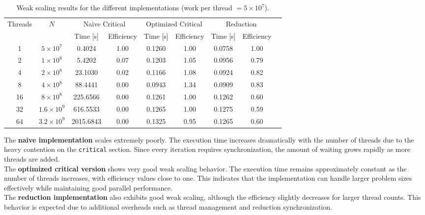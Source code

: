 \documentclass[unicode,10pt,a4paper,oneside,numbers=endperiod,openany]{scrartcl}
\begin{document}
\begin{table}[!h]
\centering
\caption{Weak scaling results for the different implementations (work per thread $=5\times10^7$).}
\label{tab:weak_scaling}
\begin{tabular}{ccccccccc}
\hline
\multirow{2}{*}{Threads} &
\multirow{2}{*}{$N$} &
\multicolumn{2}{c}{Naive Critical} &
\multicolumn{2}{c}{Optimized Critical} &
\multicolumn{2}{c}{Reduction} \\
\cline{3-8}
 &  & Time [s] & Efficiency & Time [s] & Efficiency & Time [s] & Efficiency \\
\hline
1  & $5\times10^7$   & 0.4024 & 1.00 & 0.1260 & 1.00 & 0.0758 & 1.00 \\
2  & $1\times10^8$   & 5.4202 & 0.07 & 0.1203 & 1.05 & 0.0956 & 0.79 \\
4  & $2\times10^8$   & 23.1030 & 0.02 & 0.1166 & 1.08 & 0.0924 & 0.82 \\
8  & $4\times10^8$   & 88.4441 & 0.00 & 0.0943 & 1.34 & 0.0909 & 0.83 \\
16 & $8\times10^8$   & 225.6566 & 0.00 & 0.1261 & 1.00 & 0.1262 & 0.60 \\
32 & $1.6\times10^9$ & 616.5533 & 0.00 & 0.1265 & 1.00 & 0.1275 & 0.59 \\
64 & $3.2\times10^9$ & 2015.6843 & 0.00 & 0.1325 & 0.95 & 0.1265 & 0.60 \\
\hline
\end{tabular}
\end{table}
The \textbf{naive implementation} scales extremely poorly. The execution time increases dramatically with the number of threads due to the heavy contention on the \texttt{critical} section. Since every iteration requires synchronization, the amount of waiting grows rapidly as more threads are added.\\

The \textbf{optimized critical version} shows very good weak scaling behavior. The execution time remains approximately constant as the number of threads increases, with efficiency values close to one. This indicates that the implementation can handle larger problem sizes effectively while maintaining good parallel performance.\\

The \textbf{reduction implementation} also exhibits good weak scaling, although the efficiency slightly decreases for larger thread counts. This behavior is expected due to additional overheads such as thread management and reduction synchronization.\\
\end{document}
